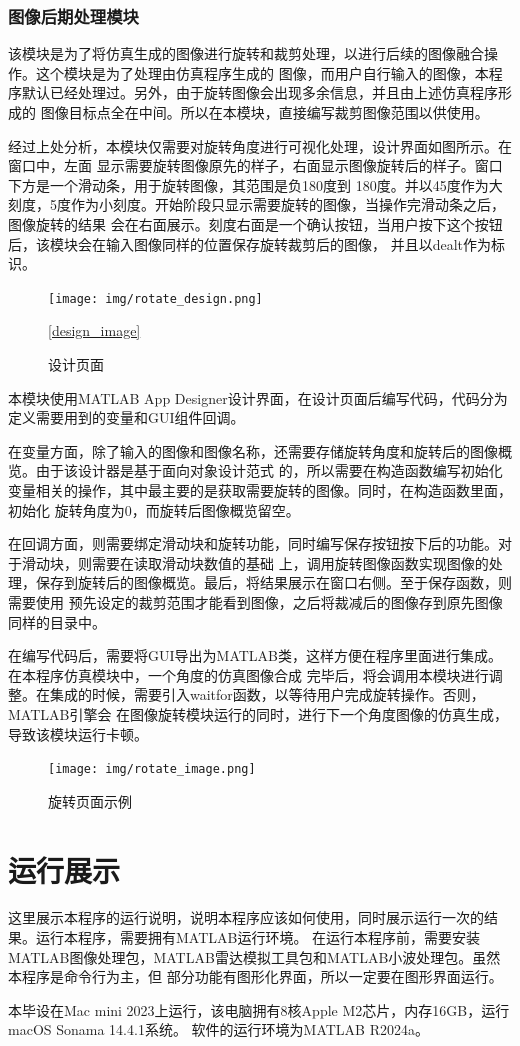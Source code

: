 \documentclass{xduugthesis}
\begin{document}
\subsection{图像后期处理模块}
该模块是为了将仿真生成的图像进行旋转和裁剪处理，以进行后续的图像融合操作。这个模块是为了处理由仿真程序生成的
图像，而用户自行输入的图像，本程序默认已经处理过。另外，由于旋转图像会出现多余信息，并且由上述仿真程序形成的
图像目标点全在中间。所以在本模块，直接编写裁剪图像范围以供使用。\par
经过上处分析，本模块仅需要对旋转角度进行可视化处理，设计界面如图\label{design_image}所示。在窗口中，左面
显示需要旋转图像原先的样子，右面显示图像旋转后的样子。窗口下方是一个滑动条，用于旋转图像，其范围是负180度到
180度。并以45度作为大刻度，5度作为小刻度。开始阶段只显示需要旋转的图像，当操作完滑动条之后，图像旋转的结果
会在右面展示。刻度右面是一个确认按钮，当用户按下这个按钮后，该模块会在输入图像同样的位置保存旋转裁剪后的图像，
并且以dealt作为标识。\par
\begin{figure}[!htb]
	\centering
	\texttt{[image: img/rotate\_design.png]}
	\caption{设计页面}\ref{design_image}
\end{figure}
本模块使用MATLAB App Designer设计界面，在设计页面后编写代码，代码分为定义需要用到的变量和GUI组件回调。\par
在变量方面，除了输入的图像和图像名称，还需要存储旋转角度和旋转后的图像概览。由于该设计器是基于面向对象设计范式
的，所以需要在构造函数编写初始化变量相关的操作，其中最主要的是获取需要旋转的图像。同时，在构造函数里面，初始化
旋转角度为0，而旋转后图像概览留空。\par
在回调方面，则需要绑定滑动块和旋转功能，同时编写保存按钮按下后的功能。对于滑动块，则需要在读取滑动块数值的基础
上，调用旋转图像函数实现图像的处理，保存到旋转后的图像概览。最后，将结果展示在窗口右侧。至于保存函数，则需要使用
预先设定的裁剪范围才能看到图像，之后将裁减后的图像存到原先图像同样的目录中。\par
在编写代码后，需要将GUI导出为MATLAB类，这样方便在程序里面进行集成。在本程序仿真模块中，一个角度的仿真图像合成
完毕后，将会调用本模块进行调整。在集成的时候，需要引入waitfor函数，以等待用户完成旋转操作。否则，MATLAB引擎会
在图像旋转模块运行的同时，进行下一个角度图像的仿真生成，导致该模块运行卡顿。\par
\begin{figure}[!htb]
	\centering
	\texttt{[image: img/rotate\_image.png]}
	\caption{旋转页面示例}
\end{figure}
\chapter{运行展示}
这里展示本程序的运行说明，说明本程序应该如何使用，同时展示运行一次的结果。运行本程序，需要拥有MATLAB运行环境。
在运行本程序前，需要安装MATLAB图像处理包，MATLAB雷达模拟工具包和MATLAB小波处理包。虽然本程序是命令行为主，但
部分功能有图形化界面，所以一定要在图形界面运行。\par
本毕设在Mac mini 2023上运行，该电脑拥有8核Apple M2芯片，内存16GB，运行macOS Sonama 14.4.1系统。
软件的运行环境为MATLAB R2024a。
\end{document}
